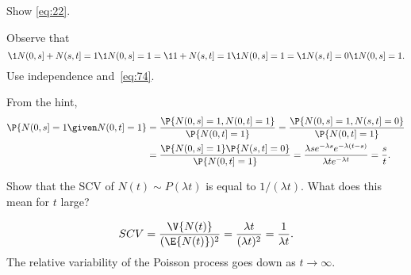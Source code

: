 \begin{exercise}\label{ex:p-36}
 Show \cref{eq:22}.
\begin{hint}
 Observe that
 \begin{equation*}
\1{N(0,s]+N(s,t]=1}\1{N(0,s]=1} = \1{1+N(s,t]=1}\1{N(0,s]=1}=\1{N(s,t]=0}\1{N(0,s]=1}.
 \end{equation*}
Use independence and~\cref{eq:74}.
\end{hint}
\begin{solution}
From the hint,
\begin{align*}
 \P{N(0,s] =1\given N(0,t]=1}
&= \frac{\P{N(0,s] =1, N(0,t]=1}}{\P{N(0,t]=1}}
= \frac{\P{N(0,s] =1, N(s,t]=0}}{\P{N(0,t]=1}} \\
&= \frac{\P{N(0,s] =1}\P{N(s,t]=0}}{\P{N(0,t]=1}} = \frac{\lambda s e^{-\lambda s} e^{-\lambda (t-s)}}{\lambda t e^{-\lambda t}} = \frac s t.
\end{align*}
\end{solution}
\end{exercise}


\begin{exercise} \label{ex:l-102}
 Show that the SCV of $N(t)\sim P(\lambda t)$ is equal to $1/(\lambda t)$. What does this mean for $t$ large?
\begin{solution}
 \begin{equation*}
SCV = \frac{\V{N(t)}}{(\E{N(t)})^2} = \frac{\lambda t}{(\lambda t)^2} = \frac1{\lambda t}.
 \end{equation*}
The relative variability of the Poisson process goes down as $t\to\infty$.
\end{solution}
\end{exercise}



